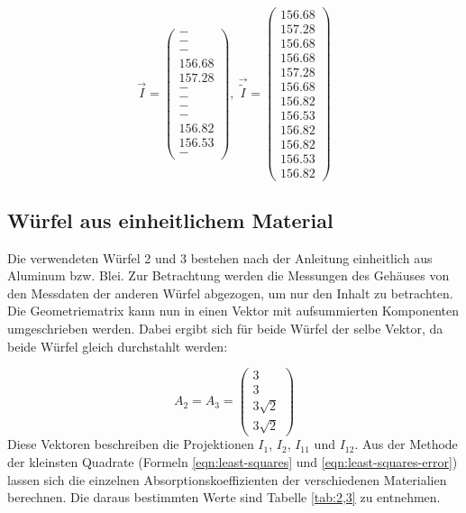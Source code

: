 \begin{equation*}
  \vec{I}=\begin{pmatrix}
        - \\
        - \\
        - \\
        156.68  \\
        157.28  \\
        - \\
        - \\
        - \\
        - \\
        156.82 \\
        156.53 \\
        -
  \end{pmatrix},\
  \vec{\tilde{I}}=\begin{pmatrix}
        156.68 \\
        157.28 \\
        156.68 \\
        156.68 \\
        157.28 \\
        156.68 \\
        156.82 \\
        156.53 \\
        156.82 \\
        156.82 \\
        156.53 \\
        156.82
  \end{pmatrix}
\end{equation*}


\subsection{Würfel aus einheitlichem Material}
Die verwendeten Würfel 2 und 3 bestehen nach der Anleitung \cite{anleitung} einheitlich aus Aluminum bzw.
Blei. Zur Betrachtung werden die Messungen des Gehäuses von den Messdaten der anderen Würfel abgezogen,
um nur den Inhalt zu betrachten. Die Geometriematrix kann nun in einen
Vektor mit aufsummierten Komponenten umgeschrieben werden. Dabei ergibt sich für beide
Würfel der selbe Vektor, da beide Würfel gleich durchstahlt werden:

\begin{equation*}
  A_2 = A_3 = \begin{pmatrix}
          3 \\
          3 \\
          3\sqrt{2} \\
          3\sqrt{2}
        \end{pmatrix}
\end{equation*}
Diese Vektoren beschreiben die Projektionen $I_1$, $I_2$, $I_{11}$ und $I_{12}$.
Aus der Methode der kleinsten Quadrate (Formeln \eqref{eqn:least-squares} und \eqref{eqn:least-squares-error})
lassen sich die einzelnen Absorptionskoeffizienten der verschiedenen Materialien berechnen.
Die daraus bestimmten Werte sind Tabelle \ref{tab:2,3} zu entnehmen.


